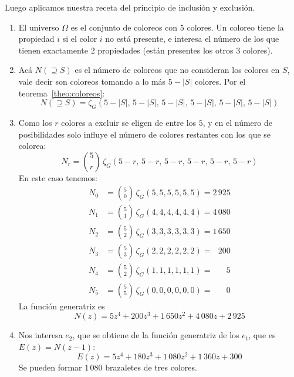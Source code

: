 \begin{example}
    Luego aplicamos nuestra receta
    del principio de inclusión y exclusión.
    \begin{enumerate}
    \item
      El universo \(\Omega\)
      es el conjunto de coloreos con \(5\) colores.
      Un coloreo tiene la propiedad \(i\)
      si el color \(i\) no está presente,
      e interesa el número
      de los que tienen exactamente \(2\) propiedades
      (están presentes los otros \(3\) colores).
    \item
      Acá \(N(\supseteq S)\) es el número de coloreos
      que no consideran los colores en \(S\),
      vale decir son coloreos
      tomando a lo más \(5 - \lvert S \rvert\) colores.
      Por el teorema~\ref{theo:coloreos}:
      \begin{equation*}
	N(\supseteq S)
	  = \zeta_G(5 - \lvert S \rvert,\,
		    5 - \lvert S \rvert,\,
		    5 - \lvert S \rvert,\,
		    5 - \lvert S \rvert,\,
		    5 - \lvert S \rvert,\,
		    5 - \lvert S \rvert)
      \end{equation*}
    \item
      Como los \(r\) colores a excluir se eligen de entre los \(5\),
      y en el número de posibilidades
      solo influye el número de colores restantes
      con los que se colorea:
      \begin{equation*}
	N_r
	  = \binom{5}{r} \,
	     \zeta_G(5 - r,\,
		     5 - r,\,
		     5 - r,\,
		     5 - r,\,
		     5 - r,\,
		     5 - r)
      \end{equation*}
      En este caso tenemos:
      \begin{align*}
	N_0
	  &= \binom{5}{0}
	       \, \zeta_G(5, 5, 5, 5, 5, 5) =		2\,925 \\
	N_1
	  &= \binom{5}{1}
	       \, \zeta_G(4, 4, 4, 4, 4, 4) =		4\,080 \\
	N_2
	  &= \binom{5}{2}
	       \, \zeta_G(3, 3, 3, 3, 3, 3) =		1\,650 \\
	N_3
	  &= \binom{5}{3}
	       \, \zeta_G(2, 2, 2, 2, 2, 2) = \phantom{0}\,200 \\
	N_4
	  &= \binom{5}{2}
	       \, \zeta_G(1, 1, 1, 1, 1, 1) = \phantom{000}\,5 \\
	N_5
	  &= \binom{5}{5}
	       \, \zeta_G(0, 0, 0, 0, 0, 0) = \phantom{000}\,0
      \end{align*}
      La función generatriz es
      \begin{equation*}
	N(z)
	  = 5 z^4 + 200 z^3 + 1\,650 z^2 + 4\,080 z + 2\,925
      \end{equation*}
    \item
      Nos interesa \(e_2\),
      que se obtiene de la función generatriz de los \(e_t\),
      que es \(E(z) = N(z - 1)\):
      \begin{equation*}
	E(z) = 5 z^4 + 180 z^3 + 1\,080 z^2 + 1\,360 z + 300
      \end{equation*}
      Se pueden formar \(1\,080\) brazaletes de tres colores.
    \end{enumerate}
  \end{example}

